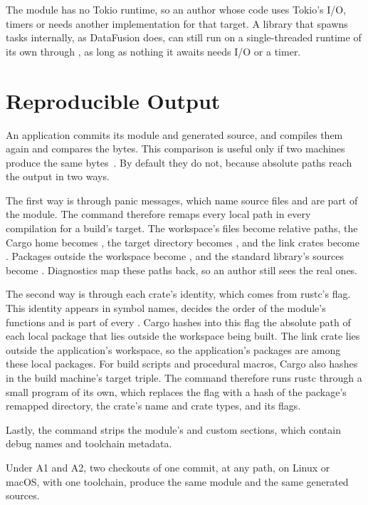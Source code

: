 \documentclass[sigconf,nonacm]{acmart}
\begin{document}
The module has no Tokio runtime, so an author whose code uses Tokio's I/O, timers or  needs another implementation for that target. A library that spawns tasks internally, as DataFusion does, can still run on a single-threaded runtime of its own through , as long as nothing it awaits needs I/O or a timer.

\section{Reproducible Output}
\label{sec:reproducible}

An application commits its module and generated source, and  compiles them again and compares the bytes. This comparison is useful only if two machines produce the same bytes~\cite{lamb2022reproducible}. By default they do not, because absolute paths reach the output in two ways.

The first way is through panic messages, which name source files and are part of the module. The command therefore remaps every local path in every compilation for a build's target. The workspace's files become relative paths, the Cargo home becomes , the target directory becomes , and the link crates become . Packages outside the workspace become , and the standard library's sources become . Diagnostics map these paths back, so an author still sees the real ones.

The second way is through each crate's identity, which comes from rustc's  flag. This identity appears in symbol names, decides the order of the module's functions and is part of every . Cargo hashes into this flag the absolute path of each local package that lies outside the workspace being built. The link crate lies outside the application's workspace, so the application's packages are among these local packages. For build scripts and procedural macros, Cargo also hashes in the build machine's target triple. The command therefore runs rustc through a small program of its own, which replaces the flag with a hash of the package's remapped directory, the crate's name and crate types, and its  flags.

Lastly, the command strips the module's  and  custom sections, which contain debug names and toolchain metadata.

\begin{claim}[Reproducibility]
\label{clm:reproducible}
Under A1 and A2, two checkouts of one commit, at any path, on Linux or macOS, with one toolchain, produce the same module and the same generated sources.
\end{claim}
\end{document}
